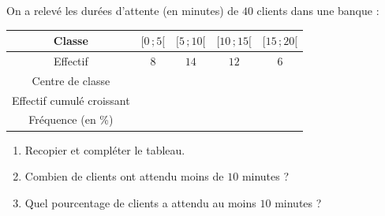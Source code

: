 \documentclass[11pt]{article}
\begin{document}
\begin{exercice}
On a relevé les durées d'attente (en minutes) de $40$ clients dans une banque :
\begin{center}
\begin{tabular}{|c|c|c|c|c|}
\hline
Classe & $[0\,;5[$ & $[5\,;10[$ & $[10\,;15[$ & $[15\,;20[$ \\
\hline
Effectif & $8$ & $14$ & $12$ & $6$ \\
\hline
Centre de classe & & & & \\
\hline
Effectif cumulé croissant & & & & \\
\hline
Fréquence (en \%) & & & & \\
\hline
\end{tabular}
\end{center}
\begin{enumerate}
\item Recopier et compléter le tableau.
\item Combien de clients ont attendu moins de $10$ minutes ?
\item Quel pourcentage de clients a attendu au moins $10$ minutes ?
\end{enumerate}
\end{exercice}
\end{document}
